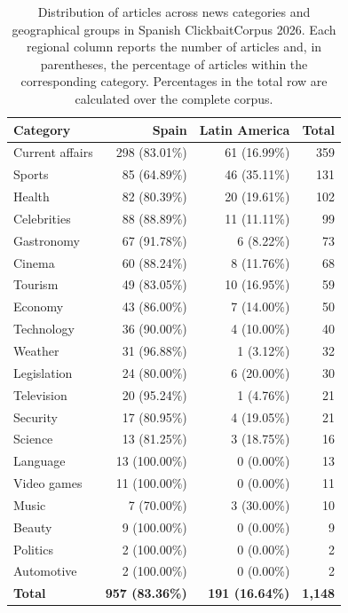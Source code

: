 \begin{table}[ht]
\centering
\small
\begin{tabular}{lrrr}
\toprule
\textbf{Category} & \textbf{Spain} & \textbf{Latin America} & \textbf{Total} \\
\midrule
Current affairs & 298 (83.01\%) & 61 (16.99\%) & 359 \\
Sports & 85 (64.89\%) & 46 (35.11\%) & 131 \\
Health & 82 (80.39\%) & 20 (19.61\%) & 102 \\
Celebrities & 88 (88.89\%) & 11 (11.11\%) & 99 \\
Gastronomy & 67 (91.78\%) & 6 (8.22\%) & 73 \\
Cinema & 60 (88.24\%) & 8 (11.76\%) & 68 \\
Tourism & 49 (83.05\%) & 10 (16.95\%) & 59 \\
Economy & 43 (86.00\%) & 7 (14.00\%) & 50 \\
Technology & 36 (90.00\%) & 4 (10.00\%) & 40 \\
Weather & 31 (96.88\%) & 1 (3.12\%) & 32 \\
Legislation & 24 (80.00\%) & 6 (20.00\%) & 30 \\
Television & 20 (95.24\%) & 1 (4.76\%) & 21 \\
Security & 17 (80.95\%) & 4 (19.05\%) & 21 \\
Science & 13 (81.25\%) & 3 (18.75\%) & 16 \\
Language & 13 (100.00\%) & 0 (0.00\%) & 13 \\
Video games & 11 (100.00\%) & 0 (0.00\%) & 11 \\
Music & 7 (70.00\%) & 3 (30.00\%) & 10 \\
Beauty & 9 (100.00\%) & 0 (0.00\%) & 9 \\
Politics & 2 (100.00\%) & 0 (0.00\%) & 2 \\
Automotive & 2 (100.00\%) & 0 (0.00\%) & 2 \\
\midrule
\textbf{Total} & \textbf{957 (83.36\%)} & \textbf{191 (16.64\%)} & \textbf{1,148} \\
\bottomrule
\end{tabular}
\caption{Distribution of articles across news categories and geographical groups in Spanish ClickbaitCorpus 2026. Each regional column reports the number of articles and, in parentheses, the percentage of articles within the corresponding category. Percentages in the total row are calculated over the complete corpus.}
\label{tab:category-region-distribution}
\end{table}
